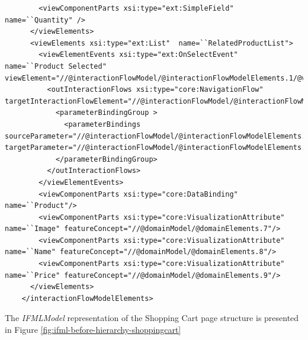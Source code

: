 \begin{lstlisting}
        <viewComponentParts xsi:type="ext:SimpleField"  name=``Quantity" />
      </viewElements>
      <viewElements xsi:type="ext:List"  name=``RelatedProductList">
        <viewElementEvents xsi:type="ext:OnSelectEvent"  name=``Product Selected" viewElement="//@interactionFlowModel/@interactionFlowModelElements.1/@viewElements.2">
          <outInteractionFlows xsi:type="core:NavigationFlow"  targetInteractionFlowElement="//@interactionFlowModel/@interactionFlowModelElements.1">
            <parameterBindingGroup >
              <parameterBindings  sourceParameter="//@interactionFlowModel/@interactionFlowModelElements.0/@viewElements.2/@parameters.0" targetParameter="//@interactionFlowModel/@interactionFlowModelElements.1/@parameters.0"/>
            </parameterBindingGroup>
          </outInteractionFlows>
        </viewElementEvents>
        <viewComponentParts xsi:type="core:DataBinding"  name=``Product"/>
        <viewComponentParts xsi:type="core:VisualizationAttribute"  name=``Image" featureConcept="//@domainModel/@domainElements.7"/>
        <viewComponentParts xsi:type="core:VisualizationAttribute"  name=``Name" featureConcept="//@domainModel/@domainElements.8"/>
        <viewComponentParts xsi:type="core:VisualizationAttribute"  name=``Price" featureConcept="//@domainModel/@domainElements.9"/>
      </viewElements>
    </interactionFlowModelElements>
\end{lstlisting}

The \textit{IFMLModel} representation of the Shopping Cart page structure is presented in Figure \ref{fig:ifml-before-hierarchy-shoppingcart}


